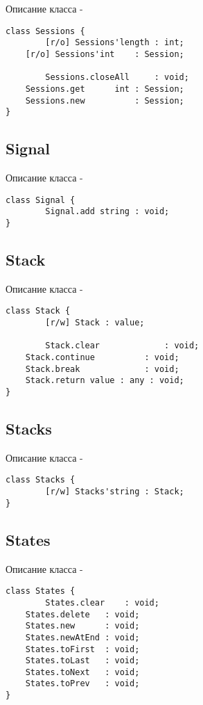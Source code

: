 \noindent Описание класса  -
\begin{lstlisting}[numbers=none]
class Sessions {
        [r/o] Sessions'length : int;
	[r/o] Sessions'int    : Session;
	
        Sessions.closeAll     : void;
	Sessions.get      int : Session;
	Sessions.new          : Session;
}
\end{lstlisting}

\subsection{{\color{orange} Signal}}

\noindent Описание класса  -
\begin{lstlisting}[numbers=none]
class Signal {
        Signal.add string : void;
}
\end{lstlisting}

\subsection{{\color{orange} Stack}}

\noindent Описание класса  -
\begin{lstlisting}[numbers=none]
class Stack {
        [r/w] Stack : value;
	
        Stack.clear             : void;
	Stack.continue          : void;
	Stack.break             : void;
	Stack.return value : any : void;
}
\end{lstlisting}

\subsection{{\color{orange} Stacks}}

\noindent Описание класса  -
\begin{lstlisting}[numbers=none]
class Stacks {
        [r/w] Stacks'string : Stack;
}
\end{lstlisting}

\subsection{{\color{orange} States}}

\noindent Описание класса  -
\begin{lstlisting}[numbers=none]
class States {
        States.clear    : void;
	States.delete   : void;
	States.new      : void;
	States.newAtEnd : void;
	States.toFirst  : void;
	States.toLast   : void;
	States.toNext   : void;
	States.toPrev   : void;
}
\end{lstlisting}

